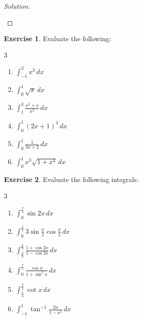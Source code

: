 \documentclass{book}
\theoremstyle{definition}
\newtheorem{exercise}{Exercise}[section]
\newenvironment{solution}
    {\begin{proof}[Solution]}
    {\end{proof}}
\begin{document}
\begin{solution}
\begin{enumerate}[label=(\roman*)]
\end{enumerate}
\end{solution}

\pagebreak

\begin{exercise}
Evaluate the following:
\begin{multicols}{3}
\begin{enumerate}[label=(\roman*)]
    \item $\displaystyle\int_{-1}^3 x^3\,dx$
    \item $\displaystyle\int_0^1 \sqrt{x}\,dx$
    \item $\displaystyle\int_1^3 \frac{x^3+x}{x^2}\,dx$
    \item $\displaystyle\int_0^1 (2x+1)^3\,dx$
    \item $\displaystyle\int_0^1 \frac{1}{3x+2}\,dx$
    \item $\displaystyle\int_0^1 x^3\sqrt{1+x^4}\,dx$

\end{enumerate}
\end{multicols}
\end{exercise}


\begin{exercise}
 Evaluate the following integrals:
\begin{multicols}{3}
\begin{enumerate}[label=(\roman*)]
    \item $\displaystyle\int_0^{\frac{\pi
    }{4}} \sin 2x\,dx$
    \item $\displaystyle\int_0^{\frac{\pi
    }{2}} 3\sin \frac{x}{2}\cos\frac{x}{2}\,dx$
    \item $\displaystyle\int_{\frac{\pi}{6}}^{\frac{\pi
    }{3}} \frac{1+\cos 2x}{1-\cos 2x}\,dx$
    \item $\displaystyle\int_0^{\frac{\pi}{2}}\frac{\cos x}{1+\sin^2 x}\,dx$
    \item $\displaystyle\int_{\frac{\pi}{4}}^{\frac{\pi
    }{2}}\cot x\,dx$
    \item $\displaystyle\int_{-1}^1\tan^{-1}\frac{2x}{1-x^2}\,dx$

\end{enumerate}
\end{multicols}
\end{exercise}
\end{document}
